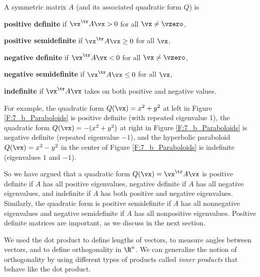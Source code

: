 \begin{definition} \label{def:7_4_definite} A symmetric matrix $A$ (and its associated quadratic form $Q$) is
\ba
\item \textbf{positive definite} if $\vx^{\tr}A\vx > 0$ for all $\vx \neq \vzero$,
\item \textbf{positive semidefinite} if $\vx^{\tr}A\vx \geq 0$ for all $\vx$,
\item \textbf{negative definite} if $\vx^{\tr}A\vx < 0$ for all $\vx \neq \vzero$,
\item \textbf{negative semidefinite} if $\vx^{\tr}A\vx \leq 0$ for all $\vx$,
\item \textbf{indefinite} if $\vx^{\tr}A\vx$ takes on both positive and negative values.
\ea
\end{definition}

For example, the quadratic form $Q(\vx) = x^2+y^2$ at left in Figure \ref{F:7_b_Paraboloids} is positive definite (with repeated eigenvalue 1), the quadratic form $Q(\vx) = -(x^2+y^2)$ at right in  Figure \ref{F:7_b_Paraboloids} is negative definite (repeated eigenvalue $-1$), and the hyperbolic paraboloid $Q(\vx) = x^2-y^2$ in the center of Figure \ref{F:7_b_Paraboloids} is indefinite (eigenvalues $1$ and $-1$). 

So we have argued that a quadratic form $Q(\vx) = \vx^{\tr} A \vx$ is positive definite if $A$ has all positive eigenvalues, negative definite if $A$ has all negative eigenvalues, and indefinite if $A$ has both positive and negative eigenvalues. Similarly, the quadratic form is positive semidefinite if $A$ has all nonnegative eigenvalues and negative semidefinite if $A$ has all nonpositive eigenvalues. Positive definite matrices are important, as we discuss in the next section.

\label{sec:pat_inner_prod}

We used the dot product to define lengths of vectors, to measure angles between vectors, and to define orthogonality in $\R^n$. We can generalize the notion of orthogonality by using different types of products called \emph{inner products} that behave like the dot product. 

